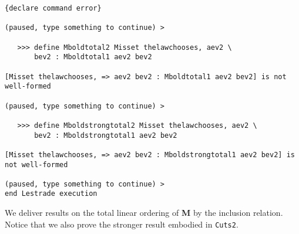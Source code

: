 \documentclass[12pt]{article}
\begin{document}
\begin{verbatim}
{declare command error}

(paused, type something to continue) >

   >>> define Mboldtotal2 Misset thelawchooses, aev2 \
       bev2 : Mboldtotal1 aev2 bev2

[Misset thelawchooses, => aev2 bev2 : Mboldtotal1 aev2 bev2] is not well-formed

(paused, type something to continue) >

   >>> define Mboldstrongtotal2 Misset thelawchooses, aev2 \
       bev2 : Mboldstrongtotal1 aev2 bev2

[Misset thelawchooses, => aev2 bev2 : Mboldstrongtotal1 aev2 bev2] is not well-formed

(paused, type something to continue) >
end Lestrade execution
\end{verbatim}

We deliver results on the total linear ordering of {\bf M} by the inclusion relation.  Notice that we also prove the stronger result embodied in {\tt Cuts2}.
\end{document}
